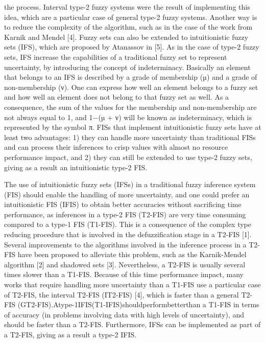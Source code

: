the process. Interval type-2 fuzzy systems were the result of implementing this
idea, which are a particular case of general type-2 fuzzy systems. Another way
is to reduce the complexity of the algorithm, such as in the case of the work
from Karnik and Mendel [4]. Fuzzy sets can also be extended to intuitionistic
fuzzy sets (IFS), which are proposed by Atanassov in [5]. As in the case of
type-2 fuzzy sets, IFS increase the capabilities of a traditional fuzzy set to
represent uncertainty, by introducing the concept of indeterminacy. Basically an
element that belongs to an IFS is described by a grade of membership (µ) and a
grade of non-membership (ν). One can express how well an element belongs to a
fuzzy set and how well an element does not belong to that fuzzy set as well. As
a consequence, the sum of the values for the membership and non-membership are
not always equal to 1, and 1−(µ + ν) will be known as indeterminacy, which is
represented by the symbol π. FISs that implement intuitionistic fuzzy sets have
at least two advantages: 1) they can handle more uncertainty than traditional
FISs and can process their inferences to crisp values with almost no resource
performance impact, and 2) they can still be extended to use type-2 fuzzy sets,
giving as a result an intuitionistic type-2 FIS.


The use of intuitionistic fuzzy sets (IFSs) in a traditional fuzzy inference
system (FIS) should enable the handling of more uncertainty, and one could
prefer an intuitionistic FIS (IFIS) to obtain better accuracies without
sacriﬁcing time performance, as inferences in a type-2 FIS (T2-FIS) are very
time consuming compared to a type-1 FIS (T1-FIS). This is a consequence of the
complex type reducing procedure that is involved in the defuzziﬁcation stage in
a T2-FIS [1]. Several improvements to the algorithms involved in the inference
process in a T2-FIS have been proposed to alleviate this problem, such as the
Karnik-Mendel algorithm [2] and shadowed sets [3]. Nevertheless, a T2-FIS is
usually several times slower than a T1-FIS. Because of this time performance
impact, many works that require handling more uncertainty than a T1-FIS use a
particular case of T2-FIS, the interval T2-FIS (IT2-FIS) [4], which is faster
than a general T2-FIS (GT2-FIS).Atype-1IFIS(T1-IFIS)shouldperformbetterthan a
T1-FIS in terms of accuracy (in problems involving data with high levels of
uncertainty), and should be faster than a T2-FIS. Furthermore, IFSs can be
implemented as part of a T2-FIS, giving as a result a type-2 IFIS.


